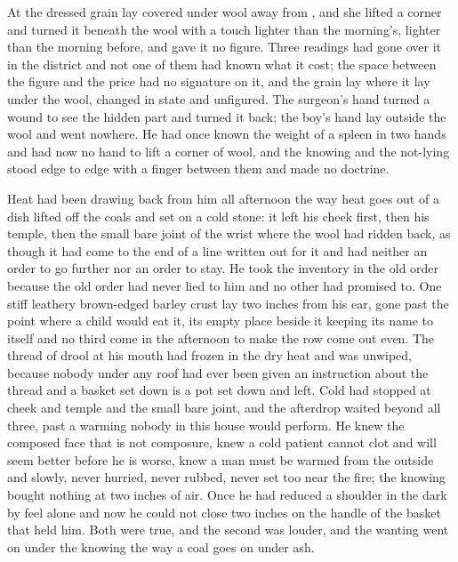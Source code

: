 At  the dressed grain lay covered under wool away from , and she lifted a corner and turned it beneath the wool with a touch lighter than the morning's, lighter than the morning before, and gave it no figure. Three readings had gone over it in the district and not one of them had known what it cost; the space between the figure and the price had no signature on it, and the grain lay where it lay under the wool, changed in state and unfigured. The surgeon's hand turned a wound to see the hidden part and turned it back; the boy's hand lay outside the wool and went nowhere. He had once known the weight of a spleen in two hands and had now no hand to lift a corner of wool, and the knowing and the not-lying stood edge to edge with a finger between them and made no doctrine.

Heat had been drawing back from him all afternoon the way heat goes out of a dish lifted off the coals and set on a cold stone: it left his cheek first, then his temple, then the small bare joint of the wrist where the wool had ridden back, as though it had come to the end of a line written out for it and had neither an order to go further nor an order to stay. He took the inventory in the old order because the old order had never lied to him and no other had promised to. One stiff leathery brown-edged barley crust lay two inches from his ear, gone past the point where a child would eat it, its empty place beside it keeping its name to itself and no third come in the afternoon to make the row come out even. The thread of drool at his mouth had frozen in the dry heat and was unwiped, because nobody under any roof had ever been given an instruction about the thread and a basket set down is a pot set down and left. Cold had stopped at cheek and temple and the small bare joint, and the afterdrop waited beyond all three, past a warming nobody in this house would perform. He knew the composed face that is not composure, knew a cold patient cannot clot and will seem better before he is worse, knew a man must be warmed from the outside and slowly, never hurried, never rubbed, never set too near the fire; the knowing bought nothing at two inches of air. Once he had reduced a shoulder in the dark by feel alone and now he could not close two inches on the handle of the basket that held him. Both were true, and the second was louder, and the wanting went on under the knowing the way a coal goes on under ash.

